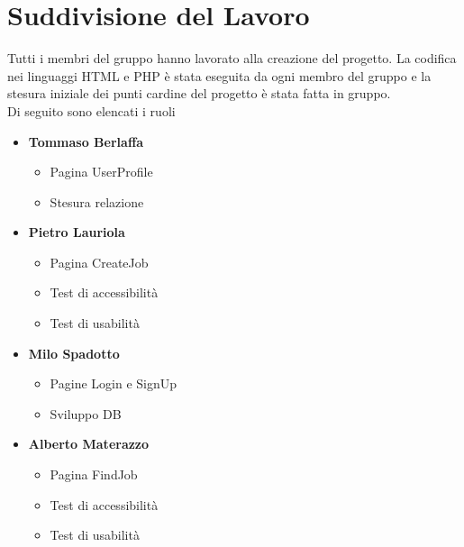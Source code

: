 \section{Suddivisione del Lavoro}
Tutti i membri del gruppo hanno lavorato alla creazione del progetto. La codifica nei linguaggi HTML e PHP è stata eseguita da ogni membro del gruppo e la stesura iniziale 
dei punti cardine del progetto è stata fatta in gruppo. \\
Di seguito sono elencati i ruoli
\begin{itemize}
	\item \textbf{Tommaso Berlaffa}
	\begin{itemize}
    \item Pagina UserProfile
    \item Stesura relazione
	\end{itemize}
	\item \textbf{Pietro Lauriola}
	\begin{itemize}
    \item Pagina CreateJob
		\item Test di accessibilità
		\item Test di usabilità
	\end{itemize}
	\item \textbf{Milo Spadotto}
	\begin{itemize}
    \item Pagine Login e SignUp
		\item Sviluppo DB
	\end{itemize}
	\item \textbf{Alberto Materazzo}
	\begin{itemize}
    \item Pagina FindJob
		\item Test di accessibilità
		\item Test di usabilità
	\end{itemize}
\end{itemize}
